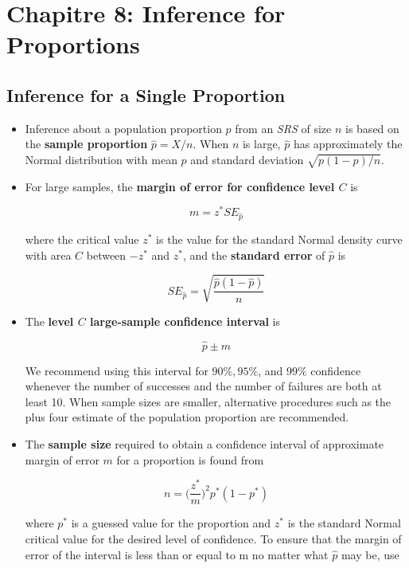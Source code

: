 \section{Chapitre 8: Inference for Proportions}
	\subsection{Inference for a Single Proportion}
		\begin{itemize}
			\item Inference about a population proportion $p$ from an \textit{SRS} of size $n$ is based on the \textbf{sample proportion} $\hat{p}=X/n$. When $n$ is large, $\hat{p}$ has approximately the Normal distribution with mean $p$ and standard deviation $\sqrt{p(1-p)/n}$.
			
			\item For large samples, the \textbf{margin of error for confidence level $C$} is
			
			\[m=z^{*}SE_{\hat{p}}\]
			
			where the critical value $z^{*}$ is the value for the standard Normal density curve with area $C$ between $-z^{*}$ and $z^{*}$, and the \textbf{standard error} of $\hat{p}$ is
			
			\[SE_{\hat{p}}=\sqrt{\frac{\hat{p}(1-\hat{p})}{n}} \]
			
			\item The \textbf{level $C$ large-sample confidence interval} is
			
			\[\hat{p}\pm m\]
			
			We recommend using this interval for $90\%, 95\%$, and $99\%$ confidence whenever the number of successes and the number of failures are both at least 10. When sample sizes are smaller, alternative procedures such as the plus four estimate of the population proportion are recommended.
			
			\item The \textbf{sample size} required to obtain a confidence interval of approximate margin of error $m$ for a proportion is found from
			
			\[n=\bigg(\frac{z^{*}}{m}\bigg)^2 p^{*}(1-p^{*})\]
			
			where $p^{*}$ is a guessed value for the proportion and $z^{*}$ is the standard Normal critical value for the desired level of confidence. To ensure that the margin of error of the interval is less than or equal to m no matter what $\hat{p}$ may be, use
			

\end{itemize}
